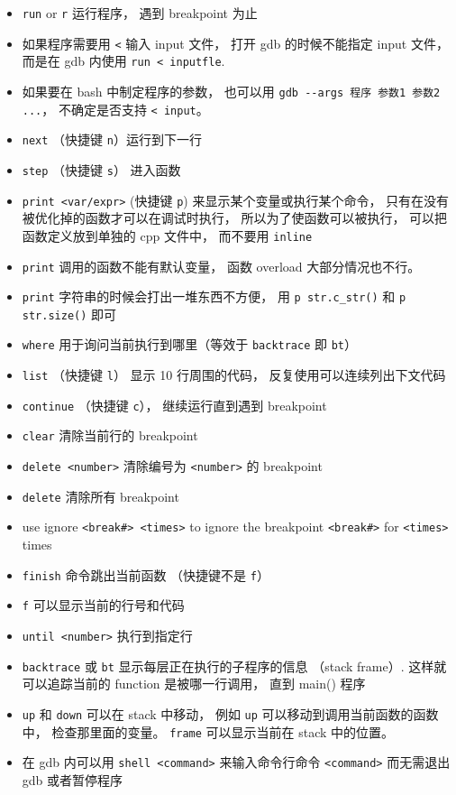 \begin{itemize}
\item \verb`run` or \verb`r` 运行程序， 遇到 breakpoint 为止
\item 如果程序需要用 \verb`<` 输入 input 文件， 打开 gdb 的时候不能指定 input 文件， 而是在 gdb 内使用 \verb`run < inputfle`.
\item 如果要在 bash 中制定程序的参数， 也可以用 \verb|gdb --args 程序 参数1 参数2 ...|， 不确定是否支持 \verb|< input|。
\item \verb`next` （快捷键 \verb`n`）运行到下一行 
\item \verb`step` （快捷键 \verb`s`） 进入函数
\item \verb`print <var/expr>` (快捷键 \verb`p`) 来显示某个变量或执行某个命令， 只有在没有被优化掉的函数才可以在调试时执行， 所以为了使函数可以被执行， 可以把函数定义放到单独的 cpp 文件中， 而不要用 \verb`inline`
\item \verb`print` 调用的函数不能有默认变量， 函数 overload 大部分情况也不行。
\item \verb`print` 字符串的时候会打出一堆东西不方便， 用 \verb`p str.c_str()` 和 \verb`p str.size()` 即可
\item \verb`where` 用于询问当前执行到哪里（等效于 \verb`backtrace` 即 \verb`bt`）
\item \verb`list` （快捷键 \verb`l`） 显示 10 行周围的代码， 反复使用可以连续列出下文代码
\item \verb`continue` （快捷键 \verb`c`）， 继续运行直到遇到 breakpoint
\item \verb`clear` 清除当前行的 breakpoint
\item \verb`delete <number>` 清除编号为 \verb`<number>` 的 breakpoint
\item \verb`delete` 清除所有 breakpoint
\item use ignore \verb`<break#> <times>` to ignore the breakpoint \verb`<break#>` for \verb`<times>` times
\item \verb`finish` 命令跳出当前函数 （快捷键不是 \verb`f`）
\item \verb`f` 可以显示当前的行号和代码
\item \verb`until <number>` 执行到指定行
\item \verb`backtrace` 或 \verb`bt` 显示每层正在执行的子程序的信息 （stack frame）. 这样就可以追踪当前的 function 是被哪一行调用， 直到 main() 程序
\item \verb|up| 和 \verb|down| 可以在 stack 中移动， 例如 \verb|up| 可以移动到调用当前函数的函数中， 检查那里面的变量。 \verb`frame` 可以显示当前在 stack 中的位置。
\item 在 gdb 内可以用 \verb`shell <command>` 来输入命令行命令 \verb`<command>` 而无需退出 gdb 或者暂停程序

\end{itemize}
